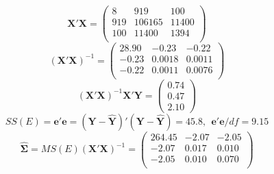 $$\textbf{X}'\textbf{X}=\left(\begin{array}{rrr} 
8      &        919      &        100\\
919    &       106165    &        11400 \\
100    &        11400    &         1394  \\
\end{array}\right)$$ 
$$(\textbf{X}'\textbf{X})^{-1}=\left(\begin{array}{rrr} 
28.90  &   -0.23  &   -0.22  \\
-0.23  &   0.0018  &   0.0011  \\
-0.22  &   0.0011  &   0.0076  \\
\end{array}\right)$$
$$ (\textbf{X}'\textbf{X})^{-1} \textbf{X}'\textbf{Y} = \left(\begin{array}{r} 0.74 \\ 0.47 \\ 2.10
\end{array}\right)$$
$$ SS(E) = \textbf{e}'\textbf{e} = (\textbf{Y}-\hat{\textbf{Y}})'(\textbf{Y}-\hat{\textbf{Y}}) = 45.8, \ \  \textbf{e}'\textbf{e}/df = 9.15$$
\bigkn
$$ \widehat{\boldsymbol{\Sigma}} = MS(E) (\textbf{X}'\textbf{X})^{-1} = \left(\begin{array}{rrr} 
264.45  &   -2.07   &  -2.05 \\
-2.07  &    0.017   &   0.010 \\
-2.05  &    0.010   &  0.070 \\
\end{array}\right)$$

\newpage

